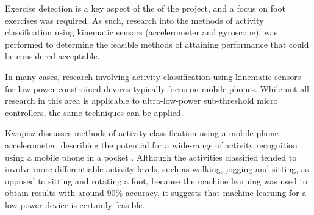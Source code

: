 
	
	Exercise detection is a key aspect of the of the project, and a focus on foot exercises was required. As such, research into the methods of activity classification using kinematic sensors (accelerometer and gyroscope), was performed to determine the feasible methods of attaining performance that could be considered acceptable.
	
	In many cases, research involving activity classification using kinematic sensors for low-power constrained devices typically focus on mobile phones. While not all research in this area is applicable to ultra-low-power sub-threshold micro controllers, the same techniques can be applied.
	
	Kwapisz discusses methods of activity classification using a mobile phone accelerometer, describing the potential for a wide-range of activity recognition using a mobile phone in a pocket \cite{kwapisz2011activity}. Although the activities classified tended to involve more differentiable activity levels, such as walking, jogging and sitting, as opposed to sitting and rotating a foot, because the machine learning was used to obtain results with around 90\% accuracy, it suggests that machine learning for a low-power device is certainly feasible.
	
	
